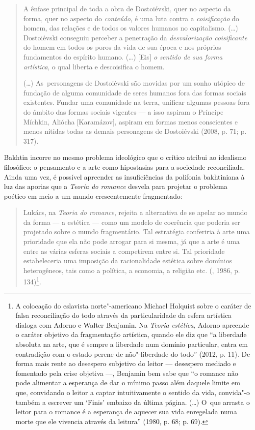 \begin{quote}
A ênfase principal de toda a obra de Dostoiévski, quer no aspecto da
forma, quer no aspecto do \emph{conteúdo}, é uma luta contra a
\emph{coisificação} do homem, das relações e de todos os valores humanos
no capitalismo. (\ldots) Dostoiévski conseguiu perceber a penetração da
\emph{desvalorização coisificante} do homem em todos os poros da vida de
sua época e nos próprios fundamentos do espírito humano. (\ldots) {[}Eis{]}
\emph{o sentido de sua forma artística}, o qual liberta e descoisifica o
homem.

\noindent (\ldots) As~personagens de Dostoiévski são movidas por um sonho utópico de
fundação de alguma comunidade de seres humanos fora das formas sociais
existentes. Fundar uma comunidade na terra, unificar algumas pessoas
fora do âmbito das formas sociais vigentes --- a isso aspiram o Príncipe
Míchkin, Aliócha {[}Karamázov{]}, aspiram em formas menos conscientes e
menos nítidas todas as demais personagens de Dostoiévski (2008, p. 71;
p. 317).
\end{quote}

Bakhtin incorre no mesmo problema ideológico que o crítico atribui ao
idealismo filosófico: o pensamento e a arte como hipostasias para a
sociedade reconciliada. Ainda uma vez, é possível apreender as
insuficiências da polifonia bakhtiniana à luz das aporias que a
\emph{Teoria do romance} desvela para projetar o problema poético em
meio a um mundo crescentemente fragmentado:

\begin{quote}
Lukács, na \emph{Teoria do romance}, rejeita a alternativa de se apelar
ao mundo da forma --- a estética --- como um modelo de coerência que
poderia ser projetado sobre o mundo fragmentário. Tal estratégia
conferiria à arte uma prioridade que ela não pode arrogar para si mesma,
já que a arte é uma entre as várias esferas sociais a competirem entre
si. Tal prioridade estabeleceria uma imposição da racionalidade estética
sobre domínios heterogêneos, tais como a política, a economia, a
religião etc. (, 1986, p. 134)\footnote{A colocação do eslavista
  norte"-americano Michael Holquist sobre o caráter de falsa
  reconciliação do todo através da particularidade da esfera artística
  dialoga com Adorno e Walter Benjamin. Na \emph{Teoria estética},
  Adorno apreende o caráter objetivo da fragmentação artística, quando
  ele diz que ``a liberdade absoluta na arte, que é sempre a liberdade
  num domínio particular, entra em contradição com o estado perene de
  não"-liberdade do todo'' (2012, p. 11). De forma mais rente ao
  desespero subjetivo do leitor --- desespero mediado e fomentado pela
  crise objetiva ---, Benjamin bem sabe que ``o romance não pode
  alimentar a esperança de dar o mínimo passo além daquele limite em
  que, convidando o leitor a captar intuitivamente o sentido da vida,
  convida"-o também a escrever um `Finis' embaixo da última página. (\ldots)
  O~que arrasta o leitor para o romance é a esperança de aquecer sua
  vida enregelada numa morte que ele vivencia através da leitura''
  (1980, p. 68; p. 69).}.
\end{quote}

